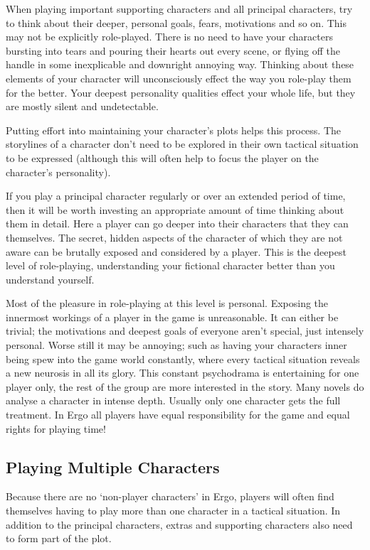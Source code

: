 \documentclass[twoside]{book}
\begin{document}
When playing important supporting characters and all principal
characters, try to think about their deeper, personal goals, fears,
motivations and so on. This may not be explicitly role-played. There
is no need to have your characters bursting into tears and pouring
their hearts out every scene, or flying off the handle in some
inexplicable and downright annoying way. Thinking about these elements
of your character will unconsciously effect the way you role-play them
for the better. Your deepest personality qualities effect your whole
life, but they are mostly silent and undetectable.

Putting effort into maintaining your character's plots helps this
process. The storylines of a character don't need to be explored in
their own tactical situation to be expressed (although this will often
help to focus the player on the character's personality).

If you play a principal character regularly or over an extended period
of time, then it will be worth investing an appropriate amount of time
thinking about them in detail. Here a player can go deeper into their
characters that they can themselves. The secret, hidden aspects of the
character of which they are not aware can be brutally exposed and
considered by a player. This is the deepest level of role-playing,
understanding your fictional character better than you understand
yourself.

Most of the pleasure in role-playing at this level is
personal. Exposing the innermost workings of a player in the game is
unreasonable. It can either be trivial; the motivations and deepest
goals of everyone aren't special, just intensely personal. Worse still
it may be annoying; such as having your characters inner being spew
into the game world constantly, where every tactical situation reveals
a new neurosis in all its glory. This constant psychodrama is
entertaining for one player only, the rest of the group are more
interested in the story. Many novels do analyse a character in intense
depth. Usually only one character gets the full treatment. In Ergo all
players have equal responsibility for the game and equal rights for
playing time!

\subsection{Playing Multiple Characters}

Because there are no `non-player characters' in Ergo, players will
often find themselves having to play more than one character in a
tactical situation. In addition to the principal characters, extras
and supporting characters also need to form part of the plot.
\end{document}
